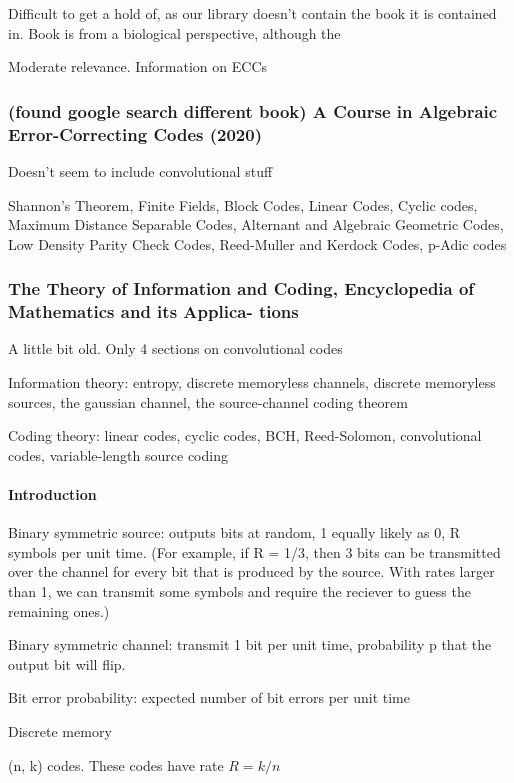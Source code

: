 \documentclass{article}
\begin{document}
Difficult to get a hold of, as our library doesn't contain the book it is contained in. Book is from a biological perspective, although the 

Moderate relevance. Information on ECCs

\subsubsection{(found google search different book) A Course in Algebraic Error-Correcting Codes (2020)}

Doesn't seem to include convolutional stuff

Shannon's Theorem, Finite Fields, Block Codes, Linear Codes, Cyclic codes, Maximum Distance Separable Codes, Alternant and Algebraic Geometric Codes, Low Density Parity Check Codes, Reed-Muller and Kerdock Codes, p-Adic codes

\subsubsection{The Theory of Information and Coding, Encyclopedia of Mathematics and its Applica-
tions}

A little bit old. Only 4 sections on convolutional codes

Information theory: entropy, discrete memoryless channels, discrete memoryless sources, the gaussian channel, the source-channel coding theorem

Coding theory: linear codes, cyclic codes, BCH, Reed-Solomon, convolutional codes, variable-length source coding

\paragraph{Introduction}

Binary symmetric source: outputs bits at random, 1 equally likely as 0, R symbols per unit time. (For example, if R = 1/3, then 3 bits can be transmitted over the channel for every bit that is produced by the source. With rates larger than 1, we can transmit some symbols and require the reciever to guess the remaining ones.)

Binary symmetric channel: transmit 1 bit per unit time, probability p that the output bit will flip.

Bit error probability: expected number of bit errors per unit time

Discrete memory

(n, k) codes. These codes have rate $R = k/n$
\end{document}
